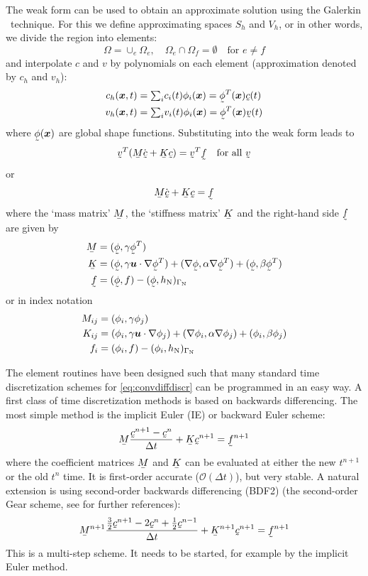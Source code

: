 The weak form can be used to obtain an approximate solution using the Galerkin \fem\
technique. For this we define approximating 
spaces $S_h$ and $V_h$, or in other words, we divide the region into elements:
\[
\Omega=\cup_e\Omega_e, \quad\Omega_{e}\cap\Omega_{f}=\emptyset\quad
   \text{for }e\neq f
\]
and interpolate $c$ and $v$ by
polynomials on each element (approximation denoted by $c_h$ and $v_h$):
\begin{align*}
    c_h(\vek x,t)&=\tsum_i c_i(t)\phi_i(\vek x)=\col\phi^T(\vek x)\col c(t)
\\
    v_h(\vek x,t)&=\tsum_i v_i(t)\phi_i(\vek x)=\col\phi^T(\vek x)\col v(t)
\end{align*}
where $\col\phi(\vek x)$ are global shape functions.  Substituting into the
weak form leads to
\[
 \col v^T(\mat M\dot{\col c}+\mat K\col c)=
        \col v^T\col f \quad\text{for all }\col v
\]
or
\begin{equation}
 \mat M\dot{\col c}+\mat K\col c= \col f
 \label{eq:convdiffdiscr}
\end{equation}
where the `mass matrix' $\mat M$,
the `stiffness matrix' $\mat K$ and
the right-hand side $\col f$ are given by
\begin{align*}
 \mat M&=(\col\phi,\gamma\col\phi^T)\\
\mat K&=(\col\phi,\gamma\vek u\cdot\nabla\col\phi^T)+
(\nabla{\col\phi},\alpha\nabla{\col\phi^T})+(\col\phi,\beta\col\phi^T)\\
\col f&= (\col\phi,f)-(\col\phi,h_{\text{N}})_{\Gamma_{\text{N}}}
\end{align*}
or in index notation
\begin{align*}
M_{ij}&=(\phi_i, \gamma\phi_j) \\
K_{ij}&=(\phi_i,\gamma\boldsymbol{u}\cdot\nabla\phi_j)
+(\nabla{\phi_i}, \alpha\nabla{\phi_j})+(\phi_i, \beta\phi_j) \\
f_i&= (\phi_i,f)-(\phi_i,h_{\text{N}})_{\Gamma_{\text{N}}}
\end{align*}

The element routines have been designed such that many standard time
discretization schemes for \eqref{eq:convdiffdiscr}
can be programmed in an easy way.
A first class of time discretization methods is based on backwards differencing.
The most simple method is the implicit Euler (IE) or backward Euler 
scheme:
\[
 \mat M\frac{\col c^{n+1}-\col c^n}{\Delta t}+\mat K\col c^{n+1}= \col f^{n+1}
\]
where the coefficient matrices $\mat M$ and $\mat K$ can be evaluated at either
the new $t^{n+1}$ or the old $t^n$ time.
It is first-order accurate ($\mathcal{O}(\Delta t)$), but very stable. A
natural extension is using second-order backwards
differencing (BDF2) (the second-order Gear scheme, see \cite{Hulsen96} for
further references):
\[
 \mat M^{n+1}\frac{\frac32\col c^{n+1}-2\col c^n+\frac12\col c^{n-1}}{\Delta t}+
\mat K^{n+1}\col c^{n+1}= \col f^{n+1}
\]
This is a multi-step scheme. It needs to be started, for example by the implicit Euler method.

